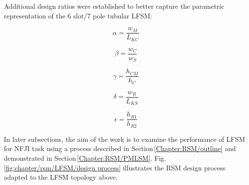         
        Additional design ratios were established to better capture the parametric representation of the 6 slot/7 pole tubular \acs{LFSM}:
        
        
        \begin{equation}
            \alpha=\frac{w_M}{L_{KC}}
            \label{eq:chap/rsm/LFSM/alpha}
        \end{equation}
        
        
        \begin{equation}
            \beta=\frac{w_C}{w_S}
            \label{eq:chap/rsm/LFSM/beta}
        \end{equation}
        
        
        \begin{equation}
            \gamma=\frac{h_{CM}}{h_C}
            \label{eq:chap/rsm/LFSM/gamma}
        \end{equation}
        
        
        \begin{equation}
            \delta=\frac{w_R}{L_{KS}}
            \label{eq:chap/rsm/LFSM/delta}
        \end{equation}
        
        
        \begin{equation}
            \epsilon=\frac{h_{R1}}{h_{R2}}
            \label{eq:chap/rsm/LFSM/epsilon}
        \end{equation}

    
        In later subsections, the aim of the work is to examine the performance of \acs{LFSM} for \acs{NFJI} task using a process described in Section\,\ref{Chapter:RSM/outline} and demonstrated in Section\,\ref{Chapter:RSM/PMLSM}. Fig.\,\ref{fig:chapter/rsm/LFSM/design process} illustrates the \acs{RSM} design process adapted to the \acs{LFSM} topology above. 
    
